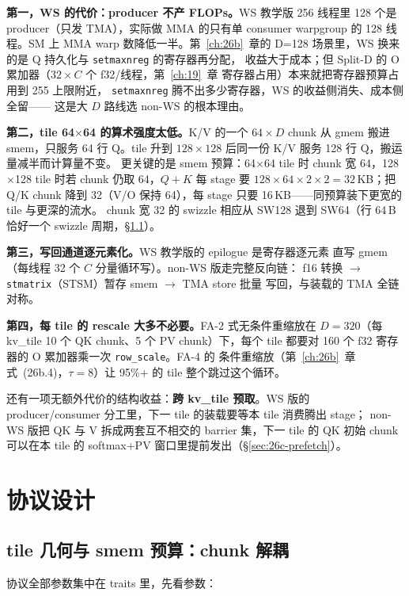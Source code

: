 \textbf{第一，WS 的代价：producer 不产 FLOPs。}WS 教学版 256 线程里
128 个是 producer（只发 TMA），实际做 MMA 的只有单 consumer warpgroup
的 128 线程。SM 上 MMA warp 数降低一半。第~\ref{ch:26b}~章的
D=128 场景里，WS 换来的是 Q 持久化与 \texttt{setmaxnreg} 的寄存器再分配，
收益大于成本；但 Split-D 的 O 累加器（$32 \times C$ 个 f32/线程，第~\ref{ch:19}~章
寄存器占用）本来就把寄存器预算占用到 255 上限附近，
\texttt{setmaxnreg} 腾不出多少寄存器，WS 的收益侧消失、成本侧全留——
这是大 $D$ 路线选 non-WS 的根本理由。

\textbf{第二，tile 64$\times$64 的算术强度太低。}K/V 的一个
$64\times D$ chunk 从 gmem 搬进 smem，只服务 64 行 Q。tile 升到
$128\times128$ 后同一份 K/V 服务 128 行 Q，搬运量减半而计算量不变。
更关键的是 smem 预算：64$\times$64 tile 时 chunk 宽 64，128$\times$128
tile 时若 chunk 仍取 64，$Q{+}K$ 每 stage 要
$128{\times}64{\times}2 \times 2 = 32$\,KB；把 Q/K chunk 降到 32（V/O 保持
64），每 stage 只要 16\,KB——同预算装下更宽的 tile 与更深的流水。
chunk 宽 32 的 swizzle 相应从 SW128 退到 SW64（行 64\,B 恰好一个
swizzle 周期，\S\ref{sec:26c-tile}）。

\textbf{第三，写回通道逐元素化。}WS 教学版的 epilogue 是寄存器逐元素
直写 gmem（每线程 32 个 $C$ 分量循环写）。non-WS 版走完整反向链：
f16 转换 $\to$ \texttt{stmatrix}（STSM）暂存 smem $\to$ TMA store 批量
写回，与装载的 TMA 全链对称。

\textbf{第四，每 tile 的 rescale 大多不必要。}FA-2 式无条件重缩放在
$D{=}320$（每 kv\_tile 10 个 QK chunk、5 个 PV chunk）下，每个 tile
都要对 160 个 f32 寄存器的 O 累加器乘一次 \texttt{row\_scale}。FA-4 的
条件重缩放（第~\ref{ch:26b}~章式~(26b.4)，$\tau = 8$）让 95\%+ 的 tile
整个跳过这个循环。

还有一项无额外代价的结构收益：\textbf{跨 kv\_tile 预取}。WS 版的
producer/consumer 分工里，下一 tile 的装载要等本 tile 消费腾出 stage；
non-WS 版把 QK 与 V 拆成两套互不相交的 barrier 集，下一 tile 的 QK
初始 chunk 可以在本 tile 的 softmax+PV 窗口里提前发出（\S\ref{sec:26c-prefetch}）。

\section{协议设计}

\subsection{tile 几何与 smem 预算：chunk 解耦}\label{sec:26c-tile}

协议全部参数集中在 traits 里，先看参数：

